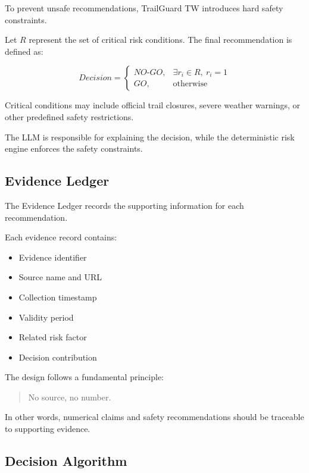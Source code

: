 \documentclass[conference]{IEEEtran}
\begin{document}
To prevent unsafe recommendations, TrailGuard TW introduces
hard safety constraints.

Let $R$ represent the set of critical risk conditions.
The final recommendation is defined as:

\begin{equation}
Decision =
\begin{cases}
NO\text{-}GO, & \exists r_i \in R,\ r_i=1 \\
GO, & \text{otherwise}
\end{cases}
\label{eq:decision}
\end{equation}

Critical conditions may include official trail closures,
severe weather warnings, or other predefined safety restrictions.

The LLM is responsible for explaining the decision, while the
deterministic risk engine enforces the safety constraints.

\subsection{Evidence Ledger}

The Evidence Ledger records the supporting information for
each recommendation.

Each evidence record contains:

\begin{itemize}
    \item Evidence identifier
    \item Source name and URL
    \item Collection timestamp
    \item Validity period
    \item Related risk factor
    \item Decision contribution
\end{itemize}

The design follows a fundamental principle:

\begin{quote}
No source, no number.
\end{quote}

In other words, numerical claims and safety recommendations
should be traceable to supporting evidence.

\subsection{Decision Algorithm}
\end{document}
